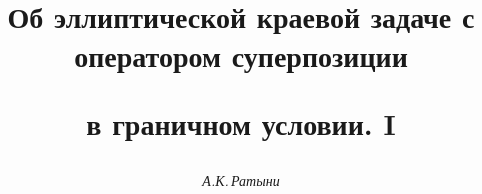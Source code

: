 

 


%  


 


\newcommand{\la}{\langle} 


\newcommand{\ra}{\rangle} 


\newcommand{\oC}{\overset{0}{C}{}} 


\newcommand{\const}{\operatorname{const}} 


\newcommand{\tts}[1]{} 


 




 


\setcounter{page}{36} 












 


\author{\it А.К.\,Ратыни} 




\title{Об эллиптической краевой задаче с оператором суперпозиции  


в граничном условии. I} 


 


\date{} 




\pagestyle{plain} %


 


